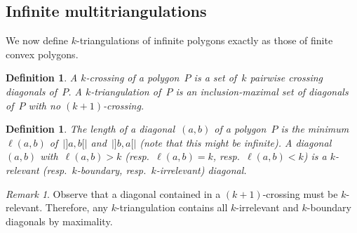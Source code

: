 \documentclass{amsart}
\newtheorem{definition}[theorem]{Definition}
\theoremstyle{remark}
\newtheorem{remark}[theorem]{Remark}
\newcommand{\darkblue}{\color{darkblue}} %
\newcommand{\defn}[1]{\textsl{\darkblue #1}} %
\newcommand*{\ktg}[0]{$k$-triangulation\xspace}
\begin{document}

\subsection{Infinite multitriangulations}

We now define $k$-triangulations of infinite polygons exactly as those of finite convex polygons.

\begin{definition}
A \defn{$k$-crossing} of a polygon~$P$ is a set of~$k$ pairwise crossing diagonals of~$P$.
A \defn{$k$-triangulation} of~$P$ is an inclusion-maximal set of diagonals of~$P$ with no $(k+1)$-crossing.
\end{definition}

\begin{definition}
The \defn{length} of a diagonal~$(a,b)$ of a polygon~$P$ is the minimum~$\ell(a,b)$ of~$|{]a,b[}|$ and~$|{]b,a[}|$ (note that this might be infinite).
A diagonal~$(a,b)$ with~$\ell(a,b) > k$ (resp.~$\ell(a,b) = k$, resp.~$\ell(a,b) < k$) is a \defn{$k$-relevant} (resp.~\defn{$k$-boundary}, resp.~\defn{$k$-irrelevant}) diagonal.
\end{definition}

\begin{remark}
\label{rem:kboundary}
Observe that a diagonal contained in a $(k+1)$-crossing must be $k$-relevant.
Therefore, any \ktg contains all $k$-irrelevant and $k$-boundary diagonals by maximality.
\end{remark}
\end{document}
